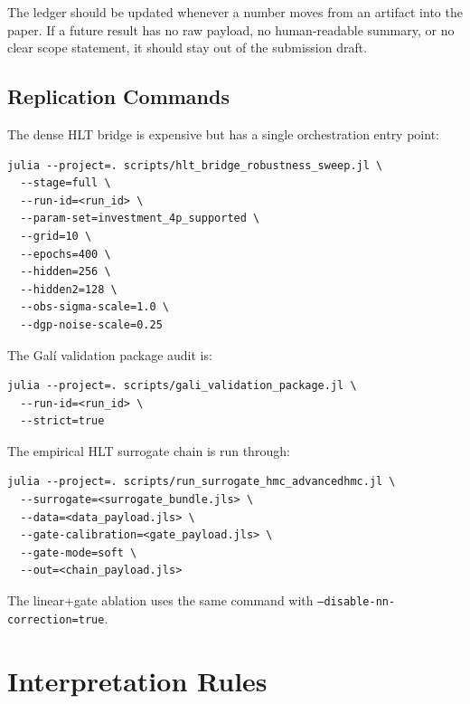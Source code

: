 \documentclass[12pt]{article}
\begin{document}
The ledger should be updated whenever a number moves from an artifact into the
paper. If a future result has no raw payload, no human-readable summary, or no
clear scope statement, it should stay out of the submission draft.

\subsection{Replication Commands}

The dense HLT bridge is expensive but has a single orchestration entry point:
\begin{verbatim}
julia --project=. scripts/hlt_bridge_robustness_sweep.jl \
  --stage=full \
  --run-id=<run_id> \
  --param-set=investment_4p_supported \
  --grid=10 \
  --epochs=400 \
  --hidden=256 \
  --hidden2=128 \
  --obs-sigma-scale=1.0 \
  --dgp-noise-scale=0.25
\end{verbatim}

The Gal\'i validation package audit is:
\begin{verbatim}
julia --project=. scripts/gali_validation_package.jl \
  --run-id=<run_id> \
  --strict=true
\end{verbatim}

The empirical HLT surrogate chain is run through:
\begin{verbatim}
julia --project=. scripts/run_surrogate_hmc_advancedhmc.jl \
  --surrogate=<surrogate_bundle.jls> \
  --data=<data_payload.jls> \
  --gate-calibration=<gate_payload.jls> \
  --gate-mode=soft \
  --out=<chain_payload.jls>
\end{verbatim}
The linear+gate ablation uses the same command with
\texttt{--disable-nn-correction=true}.

\section{Interpretation Rules}
\label{apptech:interpretation}
\end{document}
